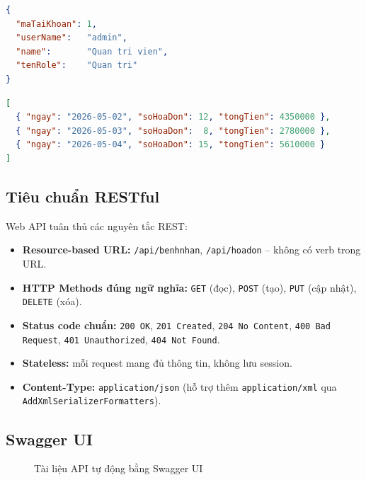 \documentclass[12pt,a4paper]{report}
\begin{document}
\begin{lstlisting}[language=json,caption={Response mẫu của POST /api/auth/login}]
{
  "maTaiKhoan": 1,
  "userName":   "admin",
  "name":       "Quan tri vien",
  "tenRole":    "Quan tri"
}
\end{lstlisting}

\begin{lstlisting}[language=json,caption={Response mẫu của GET /api/hoadon/doanhthu?thang=5\&nam=2026}]
[
  { "ngay": "2026-05-02", "soHoaDon": 12, "tongTien": 4350000 },
  { "ngay": "2026-05-03", "soHoaDon":  8, "tongTien": 2780000 },
  { "ngay": "2026-05-04", "soHoaDon": 15, "tongTien": 5610000 }
]
\end{lstlisting}

\subsection{Tiêu chuẩn RESTful}

Web API tuân thủ các nguyên tắc REST:

\begin{itemize}[leftmargin=*]
\item \textbf{Resource-based URL:} \texttt{/api/benhnhan}, \texttt{/api/hoadon} -- không có verb trong URL.
\item \textbf{HTTP Methods đúng ngữ nghĩa:} \texttt{GET} (đọc), \texttt{POST} (tạo), \texttt{PUT} (cập nhật), \texttt{DELETE} (xóa).
\item \textbf{Status code chuẩn:} \texttt{200 OK}, \texttt{201 Created}, \texttt{204 No Content}, \texttt{400 Bad Request}, \texttt{401 Unauthorized}, \texttt{404 Not Found}.
\item \textbf{Stateless:} mỗi request mang đủ thông tin, không lưu session.
\item \textbf{Content-Type:} \texttt{application/json} (hỗ trợ thêm \texttt{application/xml} qua \texttt{AddXmlSerializerFormatters}).
\end{itemize}

\subsection{Swagger UI}

\begin{figure}[H]
\centering
{}
\caption{Tài liệu API tự động bằng Swagger UI}
\label{fig:swagger}
\end{figure}
\end{document}
